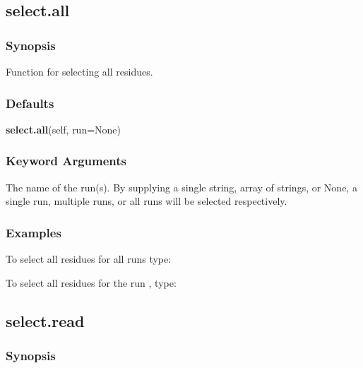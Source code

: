   

 \newpage 

 \subsection{select.all} 

  
 \subsubsection{Synopsis} 

 Function for selecting all residues. 
  

  
 \subsubsection{Defaults} 

 \textsf{\textbf{select.all}(self, run=None)} 

  
 \subsubsection{Keyword Arguments} 

   The name of the run(s).  By supplying a single string, array of strings, or None, a single run, multiple runs, or all runs will be selected respectively.  

  

  
 \subsubsection{Examples} 

 To select all residues for all runs type: 
  


 To select all residues for the run , type: 
  



  

 \newpage 

 \subsection{select.read} 

  
 \subsubsection{Synopsis} 

